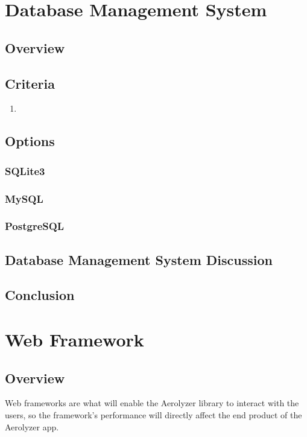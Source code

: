 \documentclass[onecolumn, draftclsnofoot,10pt, compsoc]{IEEEtran}
\begin{document}
\begin{singlespace}
\section{Database Management System}
\subsection{Overview}

\subsection{Criteria}
\begin{enumerate}
\item
\end{enumerate}
\subsection{Options}
\subsubsection{SQLite3}

\subsubsection{MySQL}

\subsubsection{PostgreSQL}

\subsection{Database Management System Discussion}

\subsection{Conclusion}


\section{Web Framework}
\subsection{Overview}
Web frameworks are what will enable the Aerolyzer library to interact with the users, so the framework's performance will directly affect the end product of the Aerolyzer app.

\end{singlespace}
\end{document}
